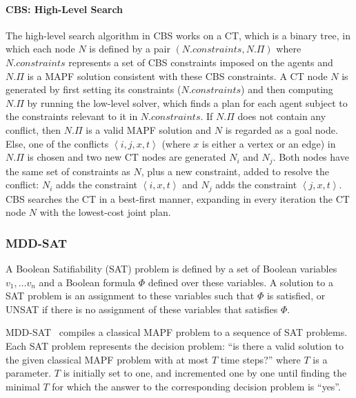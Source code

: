 \documentclass[review]{elsarticle}
\newcommand{\tuple}[1]{\ensuremath{\left \langle #1 \right \rangle }}
\newcommand{\cbs}{\ac{CBS}\xspace}
\newcommand{\ct}{\ac{CT}\xspace}
\newcommand{\mapf}{\ac{MAPF}\xspace}
\newcommand{\const}{\textit{constraints}\xspace}
\begin{document}
\paragraph{\textbf{\cbs: High-Level Search}}
The high-level search algorithm in \cbs works on a \ct, which is a binary tree, in which each node
$N$ is defined by a pair $(N.\const, N.\Pi)$ where 
$N.\const$ represents a set of \cbs constraints imposed on the agents and $N.\Pi$ is a \mapf solution consistent with these \cbs constraints. A \ct node $N$ is generated by first setting its constraints ($N.\const$) and then 
computing $N.\Pi$ by running the low-level solver, which finds a plan for each agent subject to the constraints relevant to it in $N.\const$. If $N.\Pi$ does not contain any conflict, then $N.\Pi$ is a valid \mapf solution and $N$ is regarded as a goal node. Else, one of the conflicts $\tuple{i,j,x,t}$ (where $x$ is either a vertex or an edge) in $N.\Pi$ is chosen and two new \ct nodes are generated $N_i$ and $N_j$. Both nodes have the same set of constraints as $N$, plus a new constraint, added to resolve the conflict: $N_i$ adds the constraint $\tuple{i,x,t}$
and $N_j$ adds the constraint $\tuple{j,x,t}$. \cbs searches the \ct in a best-first manner, expanding in every iteration the \ct node $N$ with the lowest-cost joint plan. %



\subsubsection{MDD-SAT}
\label{sec:mdd-sat}
A Boolean Satifiability (SAT) problem is defined by a set of Boolean variables $v_1,\ldots v_n$ and a Boolean formula $\Phi$ defined over these variables. 
A solution to a SAT problem is an assignment to these variables such that $\Phi$ is satisfied, or UNSAT if there is no assignment of these variables that satisfies $\Phi$. 

MDD-SAT~\cite{DBLP:conf/ecai/SurynekFSB16} compiles a classical \mapf problem to a sequence of SAT problems. Each SAT problem represents the decision problem: ``is there a valid solution to the given classical \mapf problem with at most $T$ time steps?'' where $T$ is a parameter. $T$ is initially set to one, and incremented one by one until finding the minimal $T$ for which the answer to the corresponding decision problem is ``yes''.  
\end{document}
